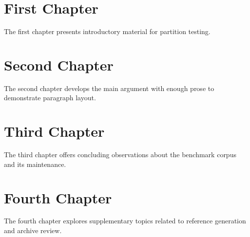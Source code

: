 \documentclass{book}
\begin{document}
\chapter{First Chapter}
The first chapter presents introductory material for partition testing.

\chapter{Second Chapter}
The second chapter develops the main argument with enough prose to
demonstrate paragraph layout.

\chapter{Third Chapter}
The third chapter offers concluding observations about the benchmark
corpus and its maintenance.

\chapter{Fourth Chapter}
The fourth chapter explores supplementary topics related to reference
generation and archive review.
\end{document}
